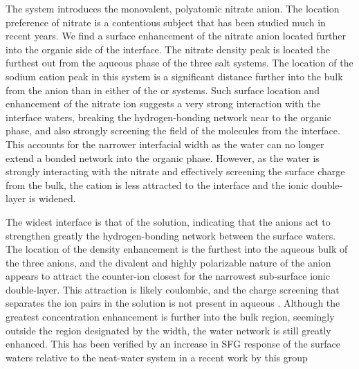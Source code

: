 The \sodnit system introduces the monovalent, polyatomic nitrate anion. The location preference of nitrate is a contentious subject that has been studied much in recent years.  We find a surface enhancement of the nitrate anion located further into the organic side of the interface. The nitrate density peak is located the furthest out from the aqueous phase of the three salt systems. The location of the sodium cation peak in this system is a significant distance further into the bulk from the anion than in either of the \nacl or \sodsul systems. Such surface location and enhancement of the nitrate ion suggests a very strong interaction with the interface waters, breaking the hydrogen-bonding network near to the organic phase, and also strongly screening the field of the \ctc molecules from the interface. This accounts for the narrower interfacial width as the water can no longer extend a bonded network into the organic phase. However, as the water is strongly interacting with the nitrate and effectively screening the surface charge from the bulk, the cation is less attracted to the interface and the ionic double-layer is widened. 

The widest interface is that of the \sodsul solution, indicating that the \sul anions act to strengthen greatly the hydrogen-bonding network between the surface waters. The location of the \sul density enhancement is the furthest into the aqueous bulk of the three anions,  and the divalent and highly polarizable nature of the anion appears to attract the counter-ion closest for the narrowest sub-surface ionic double-layer. This attraction is likely coulombic, and the charge screening that separates the ion pairs in the \sodnit solution is not present in aqueous \sodsul. Although the greatest concentration enhancement is further into the bulk region, seemingly outside the region designated by the width, the water network is still greatly enhanced. This has been verified by an increase in SFG response of the surface waters relative to the neat-water system in a recent work by this group\cite{McFearin2009}

